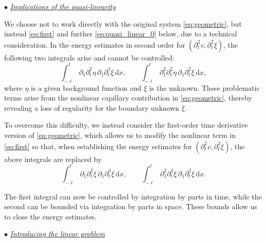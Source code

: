 \documentclass[letterpaper,reqno,10pt,twoside]{amsart}
\theoremstyle{definition}
\theoremstyle{remark}
\begin{document}
	\noindent $\bullet$ \underline{\textsl{Implications of the quasi-linearity}}
	
	We choose not to work directly with the original system \eqref{eq:geometric}, but instead \eqref{eq:first} and further \eqref{eq:quasi_linear_0} below, due to a technical consideration.
	In the energy estimates in second order for $(\partial_t^{2}v,\partial_t^{2}\xi)$,
	the following two integrals arise and cannot be controlled:
	\[
	\int_{-\ell
	}^{\ell} \partial_{1}\partial_{t}^{2}\eta \, \partial_{1}\partial_{t}^{3}\xi \, \mathrm{d}x,
	\qquad
	\int_{-\ell}^{\ell} \partial_{1}^{2}\partial_{t}^{2}\eta \, \partial_{1}\partial_{t}^{2}\xi \, \mathrm{d}x,
	\]
	where $\eta$ is a given background function and $\xi$ is the unknown.
	These problematic terms arise from the nonlinear capillary contribution in \eqref{eq:geometric}, thereby revealing a loss of regularity for the boundary unknown $\xi$.
	
	To overcome this difficulty, we instead consider the first-order time derivative version of \eqref{eq:geometric}, which allows us to modify the nonlinear term in \eqref{eq:first} so that,
	when establishing the energy estimates for $(\partial_{t}^{2}v,\partial_{t}^{2}\xi)$,
	the above integrals are replaced by
	\[
	\int_{-\ell}^{\ell} \partial_{1}\partial_{t}^{2}\xi \, \partial_{1}\partial_{t}^{3}\xi \, \mathrm{d}x,
	\qquad
	\int_{-\ell}^{\ell} \partial_{1}^{2}\partial_{t}^{2}\xi \,
	\partial_{1}\partial_{t}^{2}\xi \, \mathrm{d}x.
	\]
	
	The first integral can now be controlled by integration by parts in time,
	while the second can be bounded via integration by parts in space.
	These bounds allow us to close the energy estimates.
	
	\noindent $\bullet$ \underline{\textsl{Introducing the linear problem}} 
	
\end{document}

